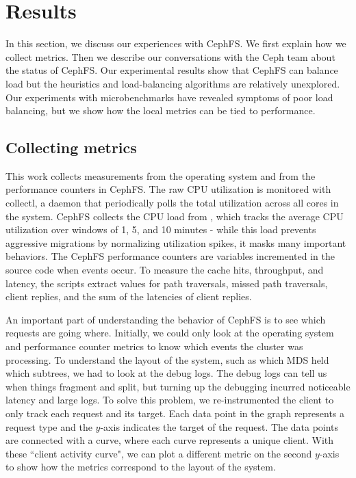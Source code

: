 \chapter{Results}
\label{results}
In this section, we discuss our experiences with CephFS. We first explain how we collect metrics. Then we describe our conversations with the Ceph team about the status of CephFS. Our experimental results show that CephFS can balance load but the heuristics and load-balancing algorithms are relatively unexplored. Our experiments with microbenchmarks have revealed symptoms of poor load balancing, but we show how the local metrics can be tied to performance. 

\section{Collecting metrics}
\label{results_collecting-metrics}
This work collects measurements from the operating system and from the performance counters in CephFS. The raw CPU utilization is monitored with collectl, a daemon that periodically polls the total utilization across all cores in the system. CephFS collects the CPU load from , which tracks the average CPU utilization over windows of 1, 5, and 10 minutes - while this load prevents aggressive migrations by normalizing utilization spikes, it masks many important behaviors. The CephFS performance counters are variables incremented in the source code when events occur. To measure the cache hits, throughput, and latency, the scripts extract values for path traversals, missed path traversals, client replies, and the sum of the latencies of client replies. 

An important part of understanding the behavior of CephFS is to see which requests are going where. Initially, we could only look at the operating system and performance counter metrics to know which events the cluster was processing. To understand the layout of the system, such as which MDS held which subtrees, we had to look at the debug logs. The debug logs can tell us when things fragment and split, but turning up the debugging incurred noticeable latency and large logs. To solve this problem, we re-instrumented the client to only track each request and its target. Each data point in the graph represents a request type and the \(y\)-axis indicates the target of the request. The data points are connected with a curve, where each curve represents a unique client. With these ``client activity curve", we can plot a different metric on the second \(y\)-axis to show how the metrics correspond to the layout of the system. 

